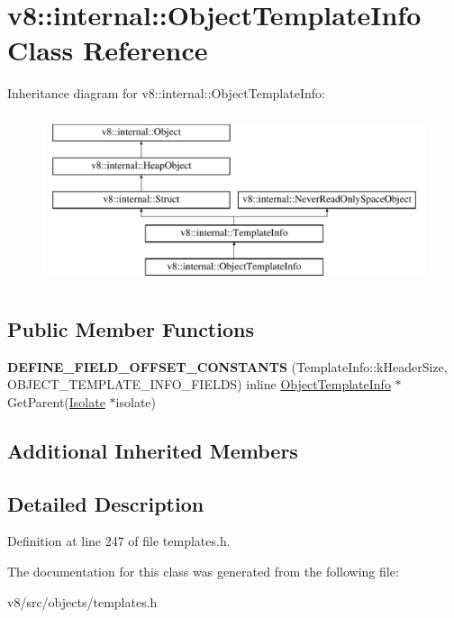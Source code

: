 \hypertarget{classv8_1_1internal_1_1ObjectTemplateInfo}{}\section{v8\+:\+:internal\+:\+:Object\+Template\+Info Class Reference}
\label{classv8_1_1internal_1_1ObjectTemplateInfo}
Inheritance diagram for v8\+:\+:internal\+:\+:Object\+Template\+Info\+:\begin{figure}[H]
\begin{center}
\leavevmode
\includegraphics[height=5.000000cm]{classv8_1_1internal_1_1ObjectTemplateInfo}
\end{center}
\end{figure}
\subsection*{Public Member Functions}
\begin{DoxyCompactItemize}
\item 
\mbox{\label{classv8_1_1internal_1_1ObjectTemplateInfo_aafc4445ff76054e53e40878a22162721}} 
{\bfseries D\+E\+F\+I\+N\+E\+\_\+\+F\+I\+E\+L\+D\+\_\+\+O\+F\+F\+S\+E\+T\+\_\+\+C\+O\+N\+S\+T\+A\+N\+TS} (Template\+Info\+::k\+Header\+Size, O\+B\+J\+E\+C\+T\+\_\+\+T\+E\+M\+P\+L\+A\+T\+E\+\_\+\+I\+N\+F\+O\+\_\+\+F\+I\+E\+L\+DS) inline \mbox{\hyperlink{classv8_1_1internal_1_1ObjectTemplateInfo}{Object\+Template\+Info}} $\ast$Get\+Parent(\mbox{\hyperlink{classv8_1_1internal_1_1Isolate}{Isolate}} $\ast$isolate)
\end{DoxyCompactItemize}
\subsection*{Additional Inherited Members}


\subsection{Detailed Description}


Definition at line 247 of file templates.\+h.



The documentation for this class was generated from the following file\+:\begin{DoxyCompactItemize}
\item 
v8/src/objects/templates.\+h\end{DoxyCompactItemize}

